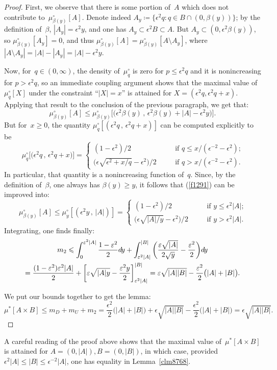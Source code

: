 \begin{proof}
First, we observe that there is some portion of~$A$ which does not contribute to~$\mu^\circ_{\beta(y)}[A]$.
Denote indeed $A_y \coloneqq \{ \epsilon^2q \colon q\in B\cap(0,\beta(y)) \}$;
by the definition of~$\beta$, $|A_y| = \epsilon^2y$,
and one has $A_y \subset \epsilon^2B \subset A$.
But $A_y \subset (0,\epsilon^2\beta(y))$,
so $\mu^{\circ}_{\beta(y)}[A_y] = 0$,
and thus $\mu^{\circ}_{\beta(y)}[A] = \mu^{\circ}_{\beta(y)}[A\setminus A_y]$,
where $|A\setminus A_y| = |A| - |A_y| = |A| - \epsilon^2y$.

Now, for~$q\in(0,\infty)$, the density of~$\mu^{\circ}_q$ is zero for $p\leq\epsilon^2q$
and it is nonincreasing for $p>\epsilon^2q$,
so an immediate coupling argument shows that the maximal value of
$\mu^{\circ}_q[X]$ under the constraint ``$|X|=x$'' is attained for
$X = (\epsilon^2q,\epsilon^2q+x)$.
Applying that result to the conclusion of the previous paragraph, we get that:
%
\[\label{f1291} \mu^{\circ}_{\beta(y)}[A] \leq
\mu^{\circ}_{\beta(y)} \big[\big(\epsilon^2\beta(y)\,,\,\epsilon^2\beta(y)+|A|-\epsilon^2y\big)\big] .\]
%
But for~$x\geq 0$, the quantity
$ \mu^{\circ}_q[(\epsilon^2q\,,\,\epsilon^2q+x)] $
can be computed explicitly to be
\[ \mu^{\circ}_q \big[\big(\epsilon^2q\,,\,\epsilon^2q+x\big)\big] =
\left\{\begin{array}{lcl} (1-\epsilon^2)/2 & \quad & \text{if $q\leq x/(\epsilon^{-2}-\epsilon^2)$;} \\
\big( \epsilon \sqrt{\epsilon^2+x/q} - \epsilon^2 \big) /2 & \quad & \text{if $q>x/(\epsilon^{-2}-\epsilon^2)$.} \end{array}\right.\]
In particular, that quantity is a nonincreasing function of~$q$.
Since, by the definition of~$\beta$, one always has $\beta(y) \geq y$,
it follows that (\ref{f1291}) can be improved into:
%
\[ \mu^\circ_{\beta(y)}[A] \leq \mu^\circ_y [(\epsilon^2y\,,\,|A|)] =
\left\{\begin{array}{lcl} (1-\epsilon^2)/2 &\quad& \text{if $y\leq\epsilon^2|A|$;} \\
\big( \epsilon\sqrt{|A|/y} - \epsilon^2 \big) /2 &\quad& \text{if $y>\epsilon^2|A|$.} \end{array}\right.\]
%
Integrating, one finds finally:
\begin{multline}
m_2 \leq \int_0^{\epsilon^2|A|} \frac{1-\epsilon^2}{2} \dx{y} + \int_{\epsilon^2|A|}^{|B|}
\bigg( \frac{\epsilon\sqrt{|A|}}{2\sqrt{y}} - \frac{\epsilon^2}{2} \bigg) \dx{y} \\
= \frac{(1-\epsilon^2)\epsilon^2|A|}{2} + \bigg[ \epsilon\sqrt{|A|y} - \frac{\epsilon^2y}{2} \bigg]^{|B|}_{\epsilon^2|A|}
= \epsilon\sqrt{|A||B|} - \frac{\epsilon^2}{2} \big(|A|+|B|\big).
\end{multline}

\step We put our bounds together to get the lemma:
\[ \mu^*[A\times B] \leq m_D + m_U + m_2
= \frac{\epsilon^2}{2} \big(|A|+|B|\big) + \epsilon\sqrt{|A||B|} - \frac{\epsilon^2}{2} \big(|A|+|B|\big)
= \epsilon\sqrt{|A||B|} .\]
\end{proof}\endgroup

\begin{Rmk}
A careful reading of the proof above shows
that the maximal value of~$\mu^*[A\times B]$ is attained for
$A = (0,|A|), B=(0,|B|)$, in which case, provided $\epsilon^2|A|\leq|B|\leq\epsilon^{-2}|A|$,
one has equality in Lemma~\ref{clm8768}.
\end{Rmk}

